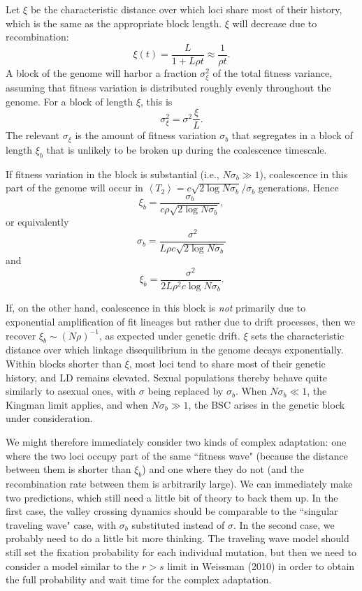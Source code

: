 \documentclass[10pt]{revtex4}
\begin{document}
Let $\xi$ be the characteristic distance over which loci share most of their history, which is the same as the appropriate block length.
$\xi$ will decrease due to recombination:
\begin{equation}
\xi (t) = \frac{L}{1 + L\rho t} \approx \frac{1}{\rho t}.
\end{equation}
A block of the genome will harbor a fraction $\sigma_\xi^2$ of the total fitness variance, assuming that fitness variation is distributed roughly evenly throughout the genome.
For a block of length $\xi$, this is
\begin{equation}
\sigma^2_\xi = \sigma^2 \frac{\xi}{L}.
\end{equation}
The relevant $\sigma_\xi$ is the amount of fitness variation $\sigma_b$ that segregates in a block of length $\xi_b$ that is unlikely to be broken up during the coalescence timescale.

If fitness variation in the block is substantial (i.e., $N\sigma_b \gg 1$), coalescence in this part of the genome will occur in $\left< T_2 \right> = c \sqrt{2\log N\sigma_b}/\sigma_b$ generations.
Hence
\begin{equation}
\xi_b = \frac{\sigma_b}{c\rho\sqrt{2\log N\sigma_b}},
\end{equation}
or equivalently
\begin{equation}
\sigma_b = \frac{\sigma^2}{L\rho c \sqrt{2 \log N\sigma_b}}
\end{equation}
and
\begin{equation}
\xi_b = \frac{\sigma^2}{2L\rho^2 c \log N\sigma_b}.
\end{equation}

If, on the other hand, coalescence in this block is \emph{not} primarily due to exponential amplification of fit lineages but rather due to drift processes, then we recover $\xi_b \sim (N\rho)^{-1}$, as expected under genetic drift.
$\xi$ sets the characteristic distance over which linkage disequilibrium in the genome decays exponentially.
Within blocks shorter than $\xi$, most loci tend to share most of their genetic history, and LD remains elevated.
Sexual populations thereby behave quite similarly to asexual ones, with $\sigma$ being replaced by $\sigma_b$.
When $N\sigma_b \ll 1$, the Kingman limit applies, and when $N\sigma_b \gg 1$, the BSC arises in the genetic block under consideration.

We might therefore immediately consider two kinds of complex adaptation: one where the two loci occupy part of the same ``fitness wave" (because the distance between them is shorter than $\xi_b$) and one where they do not (and the recombination rate between them is arbitrarily large).
We can immediately make two predictions, which still need a little bit of theory to back them up.
In the first case, the valley crossing dynamics should be comparable to the ``singular traveling wave" case, with $\sigma_b$ substituted instead of $\sigma$.
In the second case, we probably need to do a little bit more thinking.
The traveling wave model should still set the fixation probability for each individual mutation, but then we need to consider a model similar to the $r > s$ limit in Weissman (2010) in order to obtain the full probability and wait time for the complex adaptation.
\end{document}

